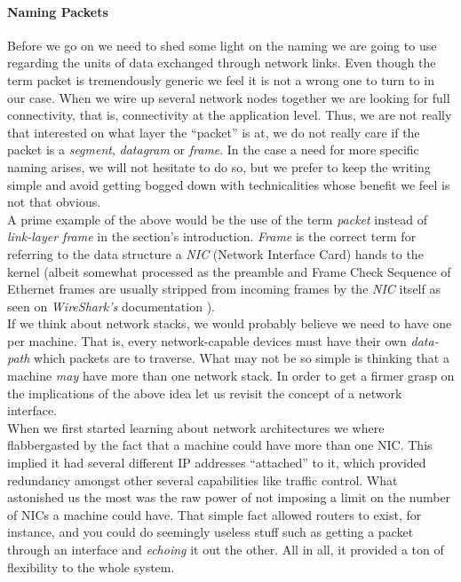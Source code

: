         \paragraph{Naming Packets}
            Before we go on we need to shed some light on the naming we are going to use regarding the units of data exchanged through network links. Even though the term packet is tremendously generic we feel it is not a wrong one to turn to in our case. When we wire up several network nodes together we are looking for full connectivity, that is, connectivity at the application level. Thus, we are not really that interested on what layer the ``packet'' is at, we do not really care if the packet is a \textit{segment}, \textit{datagram} or \textit{frame}. In the case a need for more specific naming arises, we will not hesitate to do so, but we prefer to keep the writing simple and avoid getting bogged down with technicalities whose benefit we feel is not that obvious.\\

            A prime example of the above would be the use of the term \textit{packet} instead of \textit{link-layer frame} in the section's introduction. \textit{Frame} is the correct term for referring to the data structure a \textit{NIC} (Network Interface Card) hands to the kernel (albeit somewhat processed as the preamble and Frame Check Sequence of Ethernet frames are usually stripped from incoming frames by the \textit{NIC} itself as seen on \textit{WireShark's} documentation \cite{bib:wireshark-eth-doc}).\\

        If we think about network stacks, we would probably believe we need to have one per machine. That is, every network-capable devices must have their own \textit{data-path} which packets are to traverse. What may not be so simple is thinking that a machine \textit{may} have more than one network stack. In order to get a firmer grasp on the implications of the above idea let us revisit the concept of a network interface.\\

        When we first started learning about network architectures we where flabbergasted by the fact that a machine could have more than one NIC. This implied it had several different IP addresses ``attached'' to it, which provided redundancy amongst other several capabilities like traffic control. What astonished us the most was the raw power of not imposing a limit on the number of NICs a machine could have. That simple fact allowed routers to exist, for instance, and you could do seemingly useless stuff such as getting a packet through an interface and \textit{echoing} it out the other. All in all, it provided a ton of flexibility to the whole system.\\

